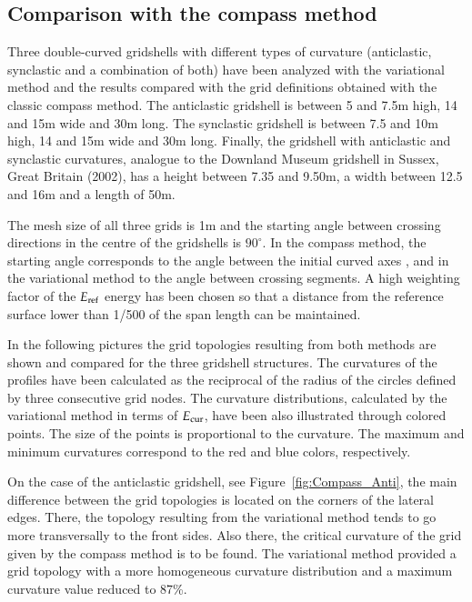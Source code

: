 \documentclass[Thesis.tex]{subfiles}
\begin{document}
\subsection{Comparison with the compass method}
Three double-curved gridshells with different types of curvature (anticlastic, synclastic and a combination of both) have been analyzed with the variational method and the results compared with the grid definitions obtained with the classic compass method. The anticlastic gridshell is between 5 and 7.5m high, 14 and 15m wide and 30m long. The synclastic gridshell is between 7.5 and 10m high, 14 and 15m wide and 30m long. Finally, the gridshell with anticlastic and synclastic curvatures, analogue to the Downland Museum gridshell in Sussex, Great Britain (2002), has a height between 7.35 and 9.50m, a width between 12.5 and 16m and a length of 50m. 

The mesh size of all three grids is 1m and the starting angle between crossing directions in the centre of the gridshells is $90^\circ$. In the compass method, the starting angle corresponds to the angle between the initial curved axes \cite{IL1974}, and in the variational method to the angle between crossing segments. A high weighting factor of the $E_{\textrm{\scriptsize{ref}}}$ energy has been chosen so that a distance from the reference surface lower than 1/500 of the span length can be maintained.

In the following pictures the grid topologies resulting from both methods are shown and compared for the three gridshell structures. The curvatures of the profiles have been calculated as the reciprocal of the radius of the circles defined by three consecutive grid nodes. The curvature distributions, calculated by the variational method in terms of $E_{\textrm{\scriptsize{cur}}}$, have been also illustrated through colored points. The size of the points is proportional to the curvature. The maximum and minimum curvatures correspond to the red and blue colors, respectively.

On the case of the anticlastic gridshell, see Figure~\ref{fig:Compass_Anti}, the main difference between the grid topologies is located on the corners of the lateral edges. There, the topology resulting from the variational method tends to go more transversally to the front sides. Also there, the critical curvature of the grid given by the compass method is to be found. The variational method provided a grid topology with a more homogeneous curvature distribution and a maximum curvature value reduced to 87\%.
\end{document}
